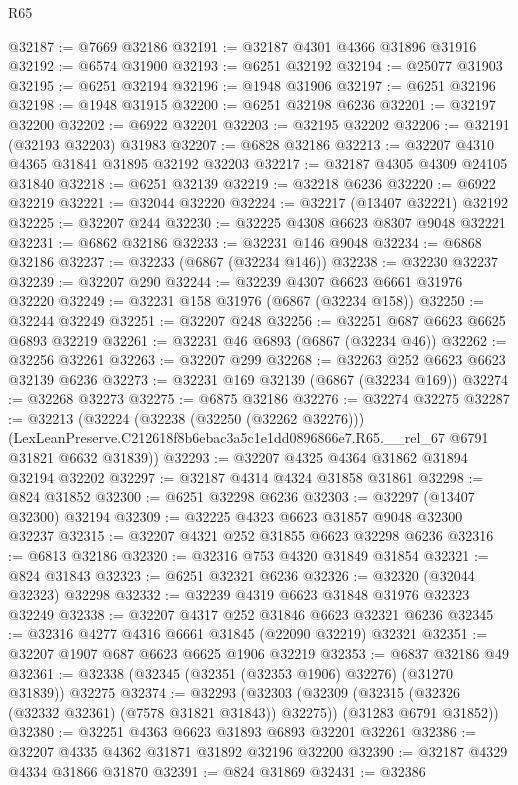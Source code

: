 \begin{lexlean}{R65}
\begin{coremodule}
{@32187 := @7669 @32186
@32191 := @32187 @4301 @4366 @31896 @31916
@32192 := @6574 @31900
@32193 := @6251 @32192
@32194 := @25077 @31903
@32195 := @6251 @32194
@32196 := @1948 @31906
@32197 := @6251 @32196
@32198 := @1948 @31915
@32200 := @6251 @32198 @6236
@32201 := @32197 @32200
@32202 := @6922 @32201
@32203 := @32195 @32202
@32206 := @32191 (@32193 @32203) @31983
@32207 := @6828 @32186
@32213 := @32207 @4310 @4365 @31841 @31895 @32192 @32203
@32217 := @32187 @4305 @4309 @24105 @31840
@32218 := @6251 @32139
@32219 := @32218 @6236
@32220 := @6922 @32219
@32221 := @32044 @32220
@32224 := @32217 (@13407 @32221) @32192
@32225 := @32207 @244
@32230 := @32225 @4308 @6623 @8307 @9048 @32221
@32231 := @6862 @32186
@32233 := @32231 @146 @9048
@32234 := @6868 @32186
@32237 := @32233 (@6867 (@32234 @146))
@32238 := @32230 @32237
@32239 := @32207 @290
@32244 := @32239 @4307 @6623 @6661 @31976 @32220
@32249 := @32231 @158 @31976 (@6867 (@32234 @158))
@32250 := @32244 @32249
@32251 := @32207 @248
@32256 := @32251 @687 @6623 @6625 @6893 @32219
@32261 := @32231 @46 @6893 (@6867 (@32234 @46))
@32262 := @32256 @32261
@32263 := @32207 @299
@32268 := @32263 @252 @6623 @6623 @32139 @6236
@32273 := @32231 @169 @32139 (@6867 (@32234 @169))
@32274 := @32268 @32273
@32275 := @6875 @32186
@32276 := @32274 @32275
@32287 := @32213
    (@32224
      (@32238 (@32250 (@32262 @32276)))
      (LexLeanPreserve.C212618f8b6ebac3a5c1e1dd0896866e7.R65.__rel_67 @6791 @31821 @6632 @31839))
@32293 := @32207 @4325 @4364 @31862 @31894 @32194 @32202
@32297 := @32187 @4314 @4324 @31858 @31861
@32298 := @824 @31852
@32300 := @6251 @32298 @6236
@32303 := @32297 (@13407 @32300) @32194
@32309 := @32225 @4323 @6623 @31857 @9048 @32300 @32237
@32315 := @32207 @4321 @252 @31855 @6623 @32298 @6236
@32316 := @6813 @32186
@32320 := @32316 @753 @4320 @31849 @31854
@32321 := @824 @31843
@32323 := @6251 @32321 @6236
@32326 := @32320 (@32044 @32323) @32298
@32332 := @32239 @4319 @6623 @31848 @31976 @32323 @32249
@32338 := @32207 @4317 @252 @31846 @6623 @32321 @6236
@32345 := @32316 @4277 @4316 @6661 @31845 (@22090 @32219) @32321
@32351 := @32207 @1907 @687 @6623 @6625 @1906 @32219
@32353 := @6837 @32186 @49
@32361 := @32338 (@32345 (@32351 (@32353 @1906) @32276) (@31270 @31839)) @32275
@32374 := @32293
    (@32303
      (@32309 (@32315 (@32326 (@32332 @32361) (@7578 @31821 @31843)) @32275))
      (@31283 @6791 @31852))
@32380 := @32251 @4363 @6623 @31893 @6893 @32201 @32261
@32386 := @32207 @4335 @4362 @31871 @31892 @32196 @32200
@32390 := @32187 @4329 @4334 @31866 @31870
@32391 := @824 @31869
@32431 := @32386
}
\end{coremodule}
\end{lexlean}
